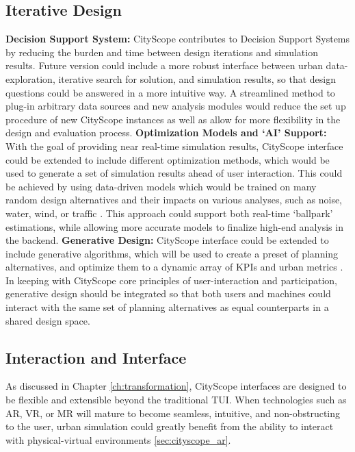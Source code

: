 {{      \subsection{Iterative Design}
      {
          \textbf{Decision Support System:} CityScope contributes to Decision Support Systems by reducing the burden and time between design iterations and simulation results. Future version could include a more robust interface between urban data-exploration, iterative search for solution, and simulation results, so that design questions could be answered in a more intuitive way. A streamlined method to plug-in arbitrary data sources and new analysis modules would reduce the set up procedure of new CityScope instances as well as allow for more flexibility in the design and evaluation process.
          \newline
          \textbf{Optimization Models and `AI' Support:} With the goal of providing near real-time simulation results, CityScope interface could be extended to include different optimization methods, which would be used to generate a set of simulation results ahead of user interaction. This could be achieved by using data-driven models which would be trained on many random design alternatives and their impacts on various analyses, such as noise, water, wind, or traffic \cite{zhang2017citymatrix, dnsl19}. This approach could support both real-time `ballpark' estimations, while allowing more accurate models to finalize high-end analysis in the backend.
          \newline
          \textbf{Generative Design:} CityScope interface could be extended to include generative algorithms, which will be used to create a preset of planning alternatives, and optimize them to a dynamic array of KPIs and urban metrics \cite{DelvebyS33:online}. In keeping with CityScope core principles of user-interaction and participation, generative design should be integrated so that both users and machines could interact with the same set of planning alternatives as equal counterparts in a shared design space.
      }

      \subsection{Interaction and Interface}
      {
          As discussed in Chapter \eqref{ch:transformation}, CityScope interfaces are designed to be flexible and extensible beyond the traditional TUI. When technologies such as AR, VR, or MR will mature to become seamless, intuitive, and non-obstructing to the user, urban simulation could greatly benefit from the ability to interact with physical-virtual environments \eqref{sec:cityscope_ar}.
      }

}}
